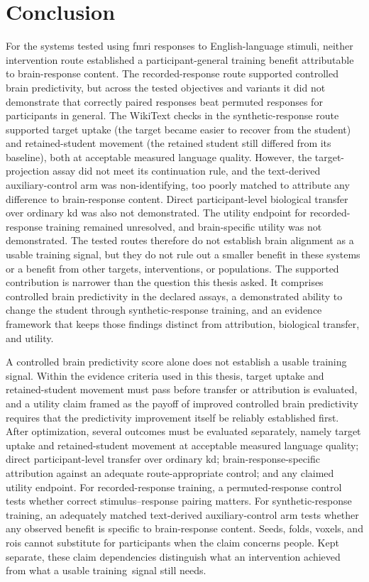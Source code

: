 \section{Conclusion}
\label{sec:conclusion}

For the systems tested using \ac{fmri} responses to English-language stimuli, neither intervention route established a participant-general training benefit attributable to brain-response content.
The recorded-response route supported controlled brain predictivity, but across the tested objectives and variants it did not demonstrate that correctly paired responses beat permuted responses for participants in general.
The WikiText checks in the synthetic-response route supported target uptake (the target became easier to recover from the student) and retained-student movement (the retained student still differed from its baseline), both at acceptable measured language quality.
However, the target-projection assay did not meet its continuation rule, and the text-derived auxiliary-control arm was non-identifying, too poorly matched to attribute any difference to brain-response content.
Direct participant-level biological transfer over ordinary \ac{kd} was also not demonstrated.
The utility endpoint for recorded-response training remained unresolved, and brain-specific utility was not demonstrated.
The tested routes therefore do not establish brain alignment as a usable training signal, but they do not rule out a smaller benefit in these systems or a benefit from other targets, interventions, or populations.
The supported contribution is narrower than the question this thesis asked.
It comprises controlled brain predictivity in the declared assays, a demonstrated ability to change the student through synthetic-response training, and an evidence framework that keeps those findings distinct from attribution, biological transfer, and utility.

A controlled brain predictivity score alone does not establish a usable training signal.
Within the evidence criteria used in this thesis, target uptake and retained-student movement must pass before transfer or attribution is evaluated, and a utility claim framed as the payoff of improved controlled brain predictivity requires that the predictivity improvement itself be reliably established first.
After optimization, several outcomes must be evaluated separately, namely target uptake and retained-student movement at acceptable measured language quality; direct participant-level transfer over ordinary \ac{kd}; brain-response-specific attribution against an adequate route-appropriate control; and any claimed utility endpoint.
For recorded-response training, a permuted-response control tests whether correct stimulus--response pairing matters.
For synthetic-response training, an adequately matched text-derived auxiliary-control arm tests whether any observed benefit is specific to brain-response content.
Seeds, folds, voxels, and \acp{roi} cannot substitute for participants when the claim concerns people.
Kept separate, these claim dependencies distinguish what an intervention achieved from what a usable training~signal still needs.
